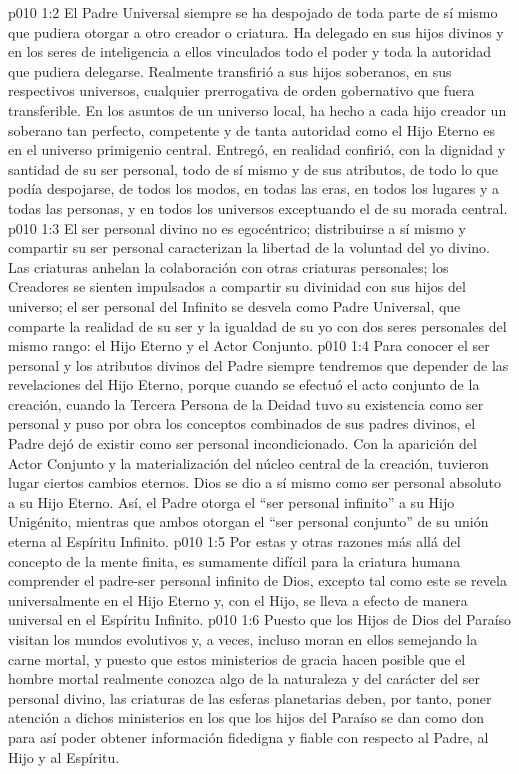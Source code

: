 \vs p010 1:2 El Padre Universal siempre se ha despojado de toda parte de sí mismo que pudiera otorgar a otro creador o criatura. Ha delegado en sus hijos divinos y en los seres de inteligencia a ellos vinculados todo el poder y toda la autoridad que pudiera delegarse. Realmente transfirió a sus hijos soberanos, en sus respectivos universos, cualquier prerrogativa de orden gobernativo que fuera transferible. En los asuntos de un universo local, ha hecho a cada hijo creador un soberano tan perfecto, competente y de tanta autoridad como el Hijo Eterno es en el universo primigenio central. Entregó, en realidad confirió, con la dignidad y santidad de su ser personal, todo de sí mismo y de sus atributos, de todo lo que podía despojarse, de todos los modos, en todas las eras, en todos los lugares y a todas las personas, y en todos los universos exceptuando el de su morada central.
\vs p010 1:3 \pc El ser personal divino no es egocéntrico; distribuirse a sí mismo y compartir su ser personal caracterizan la libertad de la voluntad del yo divino. Las criaturas anhelan la colaboración con otras criaturas personales; los Creadores se sienten impulsados a compartir su divinidad con sus hijos del universo; el ser personal del Infinito se desvela como Padre Universal, que comparte la realidad de su ser y la igualdad de su yo con dos seres personales del mismo rango: el Hijo Eterno y el Actor Conjunto.
\vs p010 1:4 \pc Para conocer el ser personal y los atributos divinos del Padre siempre tendremos que depender de las revelaciones del Hijo Eterno, porque cuando se efectuó el acto conjunto de la creación, cuando la Tercera Persona de la Deidad tuvo su existencia como ser personal y puso por obra los conceptos combinados de sus padres divinos, el Padre dejó de existir como ser personal incondicionado. Con la aparición del Actor Conjunto y la materialización del núcleo central de la creación, tuvieron lugar ciertos cambios eternos. Dios se dio a sí mismo como ser personal absoluto a su Hijo Eterno. Así, el Padre otorga el “ser personal infinito” a su Hijo Unigénito, mientras que ambos otorgan el “ser personal conjunto” de su unión eterna al Espíritu Infinito.
\vs p010 1:5 Por estas y otras razones más allá del concepto de la mente finita, es sumamente difícil para la criatura humana comprender el padre\hyp{}ser personal infinito de Dios, excepto tal como este se revela universalmente en el Hijo Eterno y, con el Hijo, se lleva a efecto de manera universal en el Espíritu Infinito.
\vs p010 1:6 Puesto que los Hijos de Dios del Paraíso visitan los mundos evolutivos y, a veces, incluso moran en ellos semejando la carne mortal, y puesto que estos ministerios de gracia hacen posible que el hombre mortal realmente conozca algo de la naturaleza y del carácter del ser personal divino, las criaturas de las esferas planetarias deben, por tanto, poner atención a dichos ministerios en los que los hijos del Paraíso se dan como don para así poder obtener información fidedigna y fiable con respecto al Padre, al Hijo y al Espíritu.
